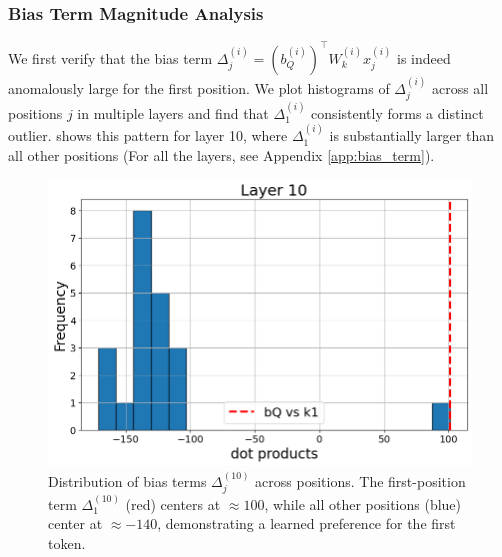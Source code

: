 \documentclass[11pt]{article}
\newif\ifResolvedcomments
\newcommand{\Resolved}[1]{\ifResolvedcomments\textcolor{green}{[Resolved: #1]}\fi}
\begin{document}
\subsubsection{Bias Term Magnitude Analysis}
\label{sec:delta_analysis}
We first verify that the bias term $\Delta_j^{(i)} = (b_Q^{(i)})^\top W_k^{(i)} x_j^{(i)}$ is indeed anomalously large for the first position. We plot histograms of $\Delta_j^{(i)}$ across all positions $j$ in multiple layers and find that $\Delta_1^{(i)}$ consistently forms a distinct outlier.  shows this pattern for layer 10, where $\Delta_1^{(i)}$ is substantially larger than all other positions (For all the layers, see Appendix \ref{app:bias_term}). \Resolved{Two things: One, we need to say that this is only an example, but that this is true for many layers. Either by giving more examples in the appendix, or running a more extensive experiment, running this on more layers and say something like "it's the highest bias by a factor of more than 2 std in some \% of layers" this is much more convincing than some possibly cherry picked layer, and luckily we don't need to cherry pick.} 

\begin{figure}[t]
  \includegraphics[width=\columnwidth]{figures/obs1_layer10.png}
  \caption{Distribution of bias terms $\Delta_j^{(10)}$ across positions. The first-position term $\Delta_1^{(10)}$ (red) centers at $\approx 100$, while all other positions (blue) center at $\approx -140$, demonstrating a learned preference for the first token.} 
  \label{fig:obs1_layer10}
\end{figure}
\end{document}
